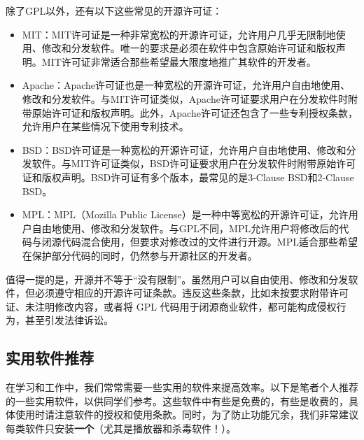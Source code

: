 \documentclass[../main.tex]{subfiles}
\begin{document}
除了GPL以外，还有以下这些常见的开源许可证：
\begin{itemize}
  \item MIT：MIT许可证是一种非常宽松的开源许可证，允许用户几乎无限制地使用、修改和分发软件。唯一的要求是必须在软件中包含原始许可证和版权声明。MIT许可证非常适合那些希望最大限度地推广其软件的开发者。
  \item Apache：Apache许可证也是一种宽松的开源许可证，允许用户自由地使用、修改和分发软件。与MIT许可证类似，Apache许可证要求用户在分发软件时附带原始许可证和版权声明。此外，Apache许可证还包含了一些专利授权条款，允许用户在某些情况下使用专利技术。
  \item BSD：BSD许可证是一种宽松的开源许可证，允许用户自由地使用、修改和分发软件。与MIT许可证类似，BSD许可证要求用户在分发软件时附带原始许可证和版权声明。BSD许可证有多个版本，最常见的是3-Clause BSD和2-Clause BSD。
  \item MPL：MPL（Mozilla Public License）是一种中等宽松的开源许可证，允许用户自由地使用、修改和分发软件。与GPL不同，MPL允许用户将修改后的代码与闭源代码混合使用，但要求对修改过的文件进行开源。MPL适合那些希望在保护部分代码的同时，仍然参与开源社区的开发者。
\end{itemize}

值得一提的是，开源并不等于“没有限制”。虽然用户可以自由使用、修改和分发软件，但必须遵守相应的开源许可证条款。违反这些条款，比如未按要求附带许可证、未注明修改内容，或者将 GPL 代码用于闭源商业软件，都可能构成侵权行为，甚至引发法律诉讼。


\subsection{实用软件推荐}

在学习和工作中，我们常常需要一些实用的软件来提高效率。以下是笔者个人推荐的一些实用软件，以供同学们参考。这些软件中有些是免费的，有些是收费的，具体使用时请注意软件的授权和使用条款。同时，为了防止功能冗余，我们非常建议每类软件只安装\textbf{一个}（尤其是播放器和杀毒软件！）。
\end{document}
